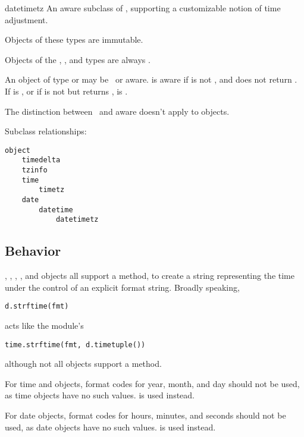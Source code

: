 \begin{classdesc*}{datetimetz}
  An aware subclass of , supporting a customizable notion of
  time adjustment.
\end{classdesc*}

Objects of these types are immutable.

Objects of the , , and  types
are always \naive.

An object  of type  or  may be
\naive\ or aware.   is aware if  is not
, and  does not return
.  If  is , or if 
is not  but  returns
,  is \naive.

The distinction between \naive\ and aware doesn't apply to
 objects.

Subclass relationships:

\begin{verbatim}
object
    timedelta
    tzinfo
    time
        timetz
    date
        datetime
            datetimetz
\end{verbatim}


\subsection{ Behavior}

, , , ,
and  objects all support a 
method, to create a string representing the time under the control of
an explicit format string.  Broadly speaking,
\begin{verbatim}
d.strftime(fmt)
\end{verbatim}
acts like the  module's
\begin{verbatim}
time.strftime(fmt, d.timetuple())
\end{verbatim}
although not all objects support a  method.

For time and  objects, format codes for year, month, and
day should not be used, as time objects have no such values.  
is used instead.

For date objects, format codes for hours, minutes, and seconds should
not be used, as date objects have no such values.   is used
instead.

